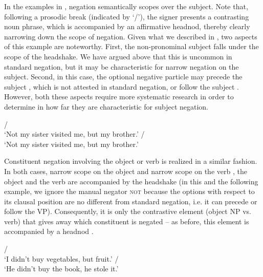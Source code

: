 \documentclass[output=paper,colorlinks,citecolor=brown]{langscibook}
\begin{document}
In the examples in , negation semantically scopes over the subject. Note that, following a prosodic break (indicated by `/'), the signer presents a contrasting noun phrase, which is accompanied by an affirmative headnod, thereby clearly narrowing down the scope of negation. Given what we described in , two aspects of this example are noteworthy. First, the non-pronominal subject falls under the scope of the headshake. We have argued above that this is uncommon in standard negation, but it may be characteristic for narrow negation on the subject. Second, in this case, the optional negative particle may precede the subject , which is not attested in standard negation, or follow the subject . However, both these aspects require more systematic research in order to determine in how far they are characteristic for subject negation.

\ea\label{ex:ngt:neg-subj}
    \ea\label{ex:ngt:neg-subj1}  /  \\ `Not my sister visited me, but my brother.'
    \ex\label{ex:ngt:neg-subj2}  /  \\ `Not my sister visited me, but my brother.'
    \z
\z

Constituent negation involving the object or verb is realized in a similar fashion. In both cases, narrow scope on the object  and narrow scope on the verb , the object and the verb are accompanied by the headshake (in this and the following example, we ignore the manual negator \textsc{not} because the options with respect to its clausal position are no different from standard negation, i.e. it can precede or follow the VP). Consequently, it is only the contrastive element (object NP vs. verb) that gives away which constituent is negated – as before, this element is accompanied by a headnod \citep[similar results are reported in][1606]{KooijEtAl2006}. 

\newpage
\ea
    \ea\label{ex:ngt:neg-obj}   /  \\ `I didn't buy vegetables, but fruit.'
    \ex\label{ex:ngt:neg-verb}   /  \\ `He didn't buy the book, he stole it.'
    \z
\z
\end{document}
